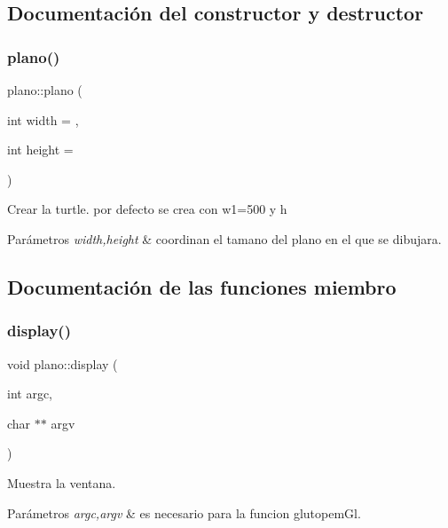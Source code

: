 \subsection{Documentación del constructor y destructor}
\mbox{\label{classplano_a07a6173550219cbe2d32925afac542a5}} 
\subsubsection{\texorpdfstring{plano()}{plano()}}
{\footnotesize\ttfamily plano\+::plano (\begin{DoxyParamCaption}\item[{int}]{width = {},  }\item[{int}]{height = {} }\end{DoxyParamCaption})}

Crear la turtle. por defecto se crea con w1=500 y h 
\begin{DoxyParams}{Parámetros}
{\em width,height} & coordinan el tamano del plano en el que se dibujara. \\
\hline
\end{DoxyParams}


\subsection{Documentación de las funciones miembro}
\mbox{\label{classplano_aa17e44a9925d265425e883f3bd8c1565}} 
\subsubsection{\texorpdfstring{display()}{display()}}
{\footnotesize\ttfamily void plano\+::display (\begin{DoxyParamCaption}\item[{int}]{argc,  }\item[{char $\ast$$\ast$}]{argv }\end{DoxyParamCaption})}

Muestra la ventana. 
\begin{DoxyParams}{Parámetros}
{\em argc,argv} & es necesario para la funcion glutopem\+Gl. \\
\hline
\end{DoxyParams}
\mbox{\label{classplano_a2febab8f233098b881ced3f4553526f2}} 

